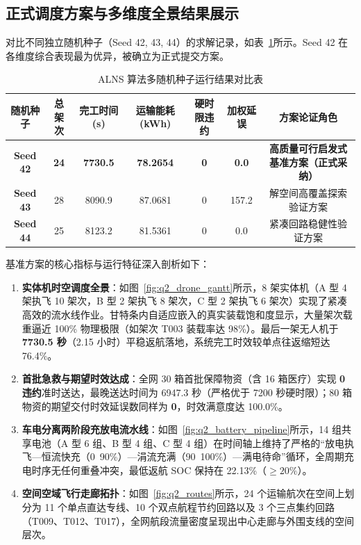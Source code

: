 \subsection{正式调度方案与多维度全景结果展示}

对比不同独立随机种子（Seed 42, 43, 44）的求解记录，如表~\ref{tab:q2_seeds}所示。Seed 42 在各维度综合表现最为优异，被确立为正式提交方案。

\begin{table}[htbp]
  \centering
  \caption{ALNS 算法多随机种子运行结果对比表}
  \label{tab:q2_seeds}
  \begin{tabular}{ccccccc}
    \toprule
    \textbf{随机种子} & \textbf{总架次} & \textbf{完工时间 (s)} & \textbf{运输能耗 (kWh)} & \textbf{硬时限违约} & \textbf{加权延误} & \textbf{方案论证角色} \\
    \midrule
    \textbf{Seed 42} & \textbf{24} & \textbf{7730.5} & \textbf{78.2654} & \textbf{0} & \textbf{0.0} & \textbf{高质量可行启发式基准方案（正式采纳）} \\
    \textbf{Seed 43} & 28 & 8090.9 & 87.0681 & 0 & 157.2 & 解空间高覆盖探索验证方案 \\
    \textbf{Seed 44} & 25 & 8123.2 & 81.5361 & 0 & 0.0 & 紧凑回路稳健性验证方案 \\
    \bottomrule
  \end{tabular}
\end{table}

基准方案的核心指标与运行特征深入剖析如下：
\begin{enumerate}
    \item \textbf{实体机时空调度全景}：如图~\ref{fig:q2_drone_gantt}所示，8 架实体机（A 型 4 架执飞 10 架次，B 型 2 架执飞 8 架次，C 型 2 架执飞 6 架次）实现了紧凑高效的流水线作业。甘特条内自适应嵌入的真实装载饱和度显示，大量架次载重逼近 100\% 物理极限（如架次 T003 装载率达 98\%）。最后一架无人机于 \textbf{7730.5 秒}（2.15 小时）平稳返航落地，系统完工时效较单点往返缩短达 76.4\%。
    
    \item \textbf{首批急救与期望时效达成}：全网 30 箱首批保障物资（含 16 箱医疗）实现 \textbf{0 违约}准时送达，最晚送达时间为 6947.3 秒（严格优于 7200 秒硬时限）；80 箱物资的期望交付时效延误数同样为 \textbf{0}，时效满意度达 100.0\%。
    
    \item \textbf{车电分离两阶段充放电流水线}：如图~\ref{fig:q2_battery_pipeline}所示，14 组共享电池（A 型 6 组、B 型 4 组、C 型 4 组）在时间轴上维持了严格的“放电执飞—恒流快充（0~90\%）—涓流充满（90~100\%）—满电待命”循环，全周期充电时序无任何重叠冲突，最低返航 SOC 保持在 22.13\%（$\ge 20\%$）。
    
    \item \textbf{空间空域飞行走廊拓扑}：如图~\ref{fig:q2_routes}所示，24 个运输航次在空间上划分为 11 个单点直达专线、10 个双点航程节约回路以及 3 个三点集约回路（T009、T012、T017），全网航段流量密度呈现出中心走廊与外围支线的空间层次。
\end{enumerate}

